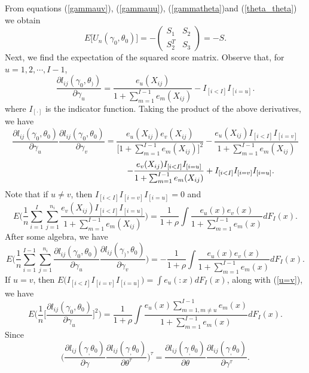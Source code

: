 \documentclass[12]{interact}
\theoremstyle{plain}%
\theoremstyle{definition}
\theoremstyle{remark}
\begin{document}
From equations (\ref{gammauv}), (\ref{gammauu}), (\ref{gammatheta})and (\ref{theta_theta}) we obtain
\begin{equation}
	E\Big[U_n(\gamma_0,\theta_0) \Big]=- \left(\begin{array}{cc} S_1 &
		S_2 \\ S_2^T & S_3
	\end{array} \right)=- S.\label{fisherinfo}
\end{equation}
Next, we find the expectation of the squared score matrix. Observe that, for $u=1, 2, \cdots, I-1$,
$$\frac{\partial l_{ij}(\gamma_0,\theta_))}{\partial\gamma_u}
=\frac{e_u( X_{ij})}
{1+\sum_{m=1}^{I-1}e_m( X_{ij})}
-I_{[i<I]}I_{[i=u]}.$$
where $I_{[\cdot]}$ is the indicator function. Taking the product of the above derivatives, we have
$$\frac{\partial l_{ij}(\gamma_0,\theta_0)}{\partial\gamma_u}
\frac{\partial l_{ij}(\gamma_0, \theta_0)}{\partial
	\gamma_v}=\frac{e_u(X_{ij})e_v(X_{ij})}{\Big[1+\sum_{m=1}^{I-1}e_m(X_{ij})\Big]^2}-\frac{e_u(
	X_{ij})I_{[i<I]}I_{[i=v]}}{1+\sum_{m=1}^{I-1}e_m(X_{ij})}$$
$$\hspace{1.5in}-\frac{e_v(X_{ij})I_{[i<I]}I_{[i=u]}}{1+\sum_{m=1}^{I-1}e_m(X_{ij})}+I_{[i<I]}I_{[i=v]}I_{[i=u]}.$$
\noindent Note that if $u \ne v$, then $I_{[i<I]}I_{[i=v]}I_{[i=u]}=0$ and
\begin{equation}
	E\Big(
	\frac{1}{n}\sum_{i=1}^I\sum_{j=1}^{n_i}\frac{e_v(X_{ij})I_{[i<I]}I_{[i=u]}}{1+\sum_{m=1}^{I-1}e_m(
		X_{ij})}\Big) =\frac{1}{1+\rho}\int \frac{e_u(x)e_v(x)}{1+\sum_{m=1}^{I-1}e_m(x)}dF_I(x).
	\label{u=v}
\end{equation}
After some algebra, we have
\begin{equation}
	E\Big(\frac{1}{n} \sum_{i=1}^{I-1}\sum_{j=1}^{n_i}\frac{\partial
		l_{ij}(\gamma_0,\theta_0)}{\partial\gamma_u} \frac{\partial
		l_{ij}(\gamma_), \theta_0)}{\partial
		\gamma_v}\Big)=-\frac{1}{1+\rho}\int \frac{e_u(x)e_v(x)}{1+\sum_{m=1}^{I-1}e_m(x)}dF_I(x).
	\label{a11}
\end{equation}
\noindent If $u=v$, then $E\big(I_{[i<I]}I_{[i=v]}I_{[i=u]}\big)=\int e_u(:x)dF_I(x)$, along with (\ref{u=v}), we have
\begin{equation}
	E\big(\frac{1}{n}\Big[\frac{\partial l_{ij}(\gamma_0,\theta_0)}{\partial \gamma_u}
	\Big]^2\big) = \frac{1}{1+\rho}\int \frac{e_u(x)\sum_{m=1,m\ne u }^{I-1}e_m(x)}
	{1+\sum_{m=1}^{I-1}e_m(x)}dF_I(x). \label{a110}
\end{equation}
Since
$$\Big(\frac{\partial l_{ij}(\gamma_,\theta_0)}{\partial
	\gamma}\frac{\partial l_{ij}(\gamma_,\theta_0)}{\partial
	\theta^\tau}\Big)^\tau =\frac{\partial
	l_{ij}(\gamma_,\theta_0)}{\partial \theta}\frac{\partial
	l_{ij}(\gamma_,\theta_0)}{\partial \gamma^\tau}.$$
\end{document}
